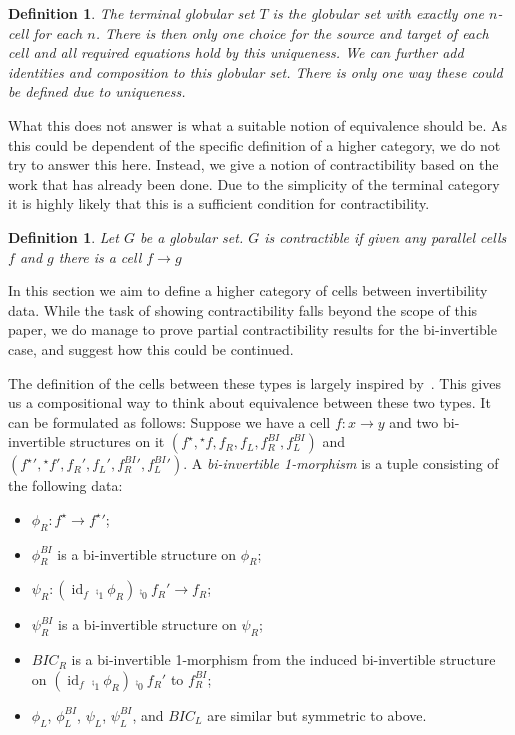 \documentclass{article}
\newtheorem{definition}[theorem]{Definition} \theoremstyle{remark}
\DeclareMathOperator{\id}{id}
\newcommand{\linv}[1]{{}^\star\!#1} \newcommand{\rinv}[1]{#1^\star}
\begin{document}
\begin{definition}
  The \emph{terminal globular set} \(T\) is the globular set with exactly one
  \(n\)-cell for each \(n\). There is then only one choice for the
  source and target of each cell and all required equations hold by
  this uniqueness. We can further add identities and composition to
  this globular set. There is only one way these could be defined due
  to uniqueness.
\end{definition}

What this does not answer is what a suitable notion of equivalence
should be. As this could be dependent of the specific definition of a
higher category, we do not try to answer this here. Instead, we give a
notion of contractibility based on the work that has already been
done. Due to the simplicity of the terminal category it is highly
likely that this is a sufficient condition for contractibility.

\begin{definition}
  Let \(G\) be a globular set. \(G\)
  is \emph{contractible} if given any parallel cells \(f\) and \(g\)
  there is a cell \(f \to g\)
\end{definition}

In this section we aim to define a higher category of cells between
invertibility data. While the task of showing contractibility falls
beyond the scope of this paper, we do manage to prove partial
contractibility results for the bi-invertible case, and suggest how
this could be continued.

The definition of the cells between these types is largely inspired
by~\cite[Lemma 4.2.5]{hottbook}. This gives us a compositional way to
think about equivalence between these two types. It can be formulated
as follows: Suppose we have a cell \(f : x \to y\) and two
bi-invertible structures on it \((\rinv f, \linv f, f_R, f_L,
f_R^{BI}, f_L^{BI})\) and \((\rinv f{}' , \linv f{}', f_R', f_L',
f_R^{BI}{}', f_L^{BI}{}')\). A \emph{bi-invertible 1-morphism} is a tuple
consisting of the following data:
\begin{itemize}
\item \(\phi_R : \rinv f \to \rinv f{}'\);
\item \(\phi_R^{BI}\) is a bi-invertible structure on \(\phi_R\);
\item \(\psi_R : (\id_f \comp_1 \phi_R) \comp_0 f_R' \to f_R\);
\item \(\psi_R^{BI}\) is a bi-invertible structure on \(\psi_R\);
\item \(BIC_R\) is a bi-invertible 1-morphism from the induced bi-invertible structure on
  \((\id_f \comp_1 \phi_R) \comp_0 f_R'\) to \(f_R^{BI}\);
\item \(\phi_L\), \(\phi_L^{BI}\), \(\psi_L\), \(\psi_L^{BI}\), and
  \(BIC_L\) are similar but symmetric to above.
\end{itemize}
\end{document}
